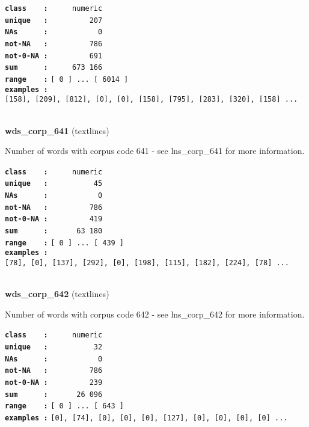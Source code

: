 \documentclass[]{article}
\begin{document}
\textbf{\texttt{class\ \ \ \ :}} \texttt{~~~~~numeric}\\
\textbf{\texttt{unique\ \ \ :}} \texttt{~~~~~~~~~207}\\
\textbf{\texttt{NAs\ \ \ \ \ \ :}} \texttt{~~~~~~~~~~~0}\\
\textbf{\texttt{not-NA\ \ \ :}} \texttt{~~~~~~~~~786}\\
\textbf{\texttt{not-0-NA\ :}} \texttt{~~~~~~~~~691}\\
\textbf{\texttt{sum\ \ \ \ \ \ :}} \texttt{~~~~~673~166}\\
\textbf{\texttt{range\ \ \ \ :}}
\texttt{{[}\ 0\ {]}\ ...\ {[}\ 6014\ {]}}\\
\textbf{\texttt{examples\ :}}
\texttt{{[}158{]},\ {[}209{]},\ {[}812{]},\ {[}0{]},\ {[}0{]},\ {[}158{]},\ {[}795{]},\ {[}283{]},\ {[}320{]},\ {[}158{]}\ ...}\\

~

\textbf{wds\_corp\_641} (textlines)

Number of words with corpus code 641 - see lns\_corp\_641 for more
information.

\textbf{\texttt{class\ \ \ \ :}} \texttt{~~~~~numeric}\\
\textbf{\texttt{unique\ \ \ :}} \texttt{~~~~~~~~~~45}\\
\textbf{\texttt{NAs\ \ \ \ \ \ :}} \texttt{~~~~~~~~~~~0}\\
\textbf{\texttt{not-NA\ \ \ :}} \texttt{~~~~~~~~~786}\\
\textbf{\texttt{not-0-NA\ :}} \texttt{~~~~~~~~~419}\\
\textbf{\texttt{sum\ \ \ \ \ \ :}} \texttt{~~~~~~63~180}\\
\textbf{\texttt{range\ \ \ \ :}}
\texttt{{[}\ 0\ {]}\ ...\ {[}\ 439\ {]}}\\
\textbf{\texttt{examples\ :}}
\texttt{{[}78{]},\ {[}0{]},\ {[}137{]},\ {[}292{]},\ {[}0{]},\ {[}198{]},\ {[}115{]},\ {[}182{]},\ {[}224{]},\ {[}78{]}\ ...}\\

~

\textbf{wds\_corp\_642} (textlines)

Number of words with corpus code 642 - see lns\_corp\_642 for more
information.

\textbf{\texttt{class\ \ \ \ :}} \texttt{~~~~~numeric}\\
\textbf{\texttt{unique\ \ \ :}} \texttt{~~~~~~~~~~32}\\
\textbf{\texttt{NAs\ \ \ \ \ \ :}} \texttt{~~~~~~~~~~~0}\\
\textbf{\texttt{not-NA\ \ \ :}} \texttt{~~~~~~~~~786}\\
\textbf{\texttt{not-0-NA\ :}} \texttt{~~~~~~~~~239}\\
\textbf{\texttt{sum\ \ \ \ \ \ :}} \texttt{~~~~~~26~096}\\
\textbf{\texttt{range\ \ \ \ :}}
\texttt{{[}\ 0\ {]}\ ...\ {[}\ 643\ {]}}\\
\textbf{\texttt{examples\ :}}
\texttt{{[}0{]},\ {[}74{]},\ {[}0{]},\ {[}0{]},\ {[}0{]},\ {[}127{]},\ {[}0{]},\ {[}0{]},\ {[}0{]},\ {[}0{]}\ ...}\\
\end{document}
